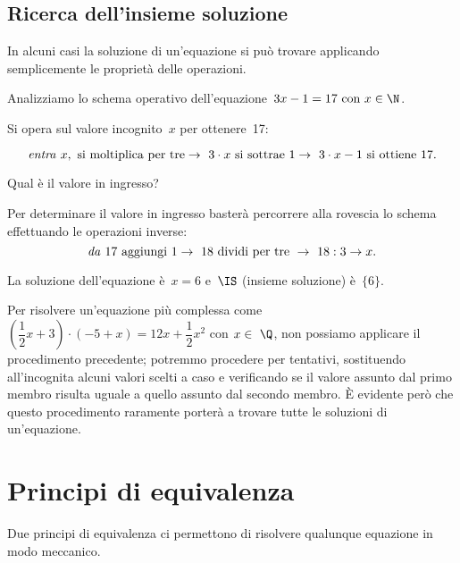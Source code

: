 \subsection{Ricerca dell'insieme soluzione}
In alcuni casi la soluzione di un'equazione si può
trovare applicando semplicemente le proprietà delle operazioni.

\begin{esempio}{}{}
Analizziamo lo schema operativo dell'equazione~\(3x-1=17 \text{ con } 
x\in\N\).

Si opera sul valore incognito~\(x\) per ottenere~17:

\[\text{\emph{entra} } x,\text{ si moltiplica per tre}\to~3\cdot x%
\text{ si sottrae } 1\to~3\cdot x-1 \text{ si ottiene } 17.\]

Qual è il valore in ingresso?

Per determinare il valore in ingresso basterà percorrere alla rovescia 
lo schema effettuando le operazioni inverse:
\[\text{\emph{da} } 17 \text{ aggiungi } 1\to~18 \text{ dividi per tre 
}\to~18:3 
\to x.\]

La soluzione dell'equazione è~\(x = 6\) e~\(\IS\) (insieme
soluzione) è~\(\{6\}\).
\end{esempio}


Per risolvere un'equazione più complessa come
\(\left(\dfrac{1}{2}x+3\right)\cdot (-5+x)=12x+\dfrac{1}{2}x^{2}\) con
\(x\in~\Q\), non possiamo applicare il procedimento precedente; potremmo
procedere per tentativi, sostituendo all'incognita
alcuni valori scelti a caso e verificando se il valore assunto dal
primo membro risulta uguale a quello assunto dal secondo membro. È
evidente però che questo procedimento raramente porterà a trovare
tutte le soluzioni di un'equazione.


\section{Principi di equivalenza}
\label{sec:eq1_principi} 

Due principi di equivalenza ci permettono di risolvere qualunque equazione 
in modo meccanico.

